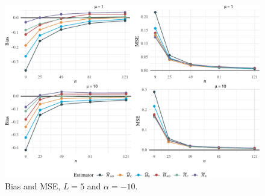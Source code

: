 \documentclass[remotesensing,article,submit,moreauthors,pdftex]{Definitions/mdpi}
\begin{document}
\begin{figure}[hbt]
\includegraphics[width=0.8\linewidth]{Identifying-Heterogeneity-in-SAR-Data-with-New-Test-Statistics_files/figure-latex/Plot_bias_mse_gi0-1} \caption{Bias and MSE, $L=5$ and  $\alpha=-10$.}\label{fig:Plot_bias_mse_gi0}
\end{figure}
\end{document}
